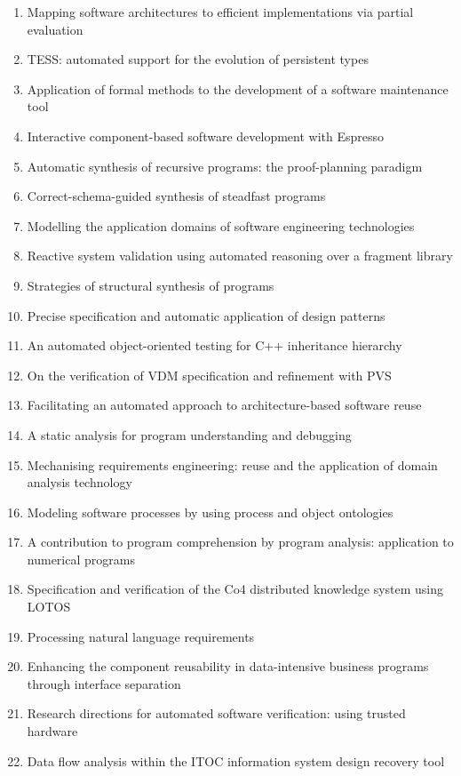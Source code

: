 \begin{enumerate}[itemsep=-1ex]
  \item Mapping software architectures to efficient implementations via partial evaluation
  \item TESS: automated support for the evolution of persistent types
  \item Application of formal methods to the development of a software maintenance tool
  \item Interactive component-based software development with Espresso
  \item Automatic synthesis of recursive programs: the proof-planning paradigm
  \item Correct-schema-guided synthesis of steadfast programs
  \item Modelling the application domains of software engineering technologies
  \item Reactive system validation using automated reasoning over a fragment library
  \item Strategies of structural synthesis of programs
  \item Precise specification and automatic application of design patterns
  \item An automated object-oriented testing for C++ inheritance hierarchy
  \item On the verification of VDM specification and refinement with PVS
  \item Facilitating an automated approach to architecture-based software reuse
  \item A static analysis for program understanding and debugging
  \item Mechanising requirements engineering: reuse and the application of domain analysis technology
  \item Modeling software processes by using process and object ontologies
  \item A contribution to program comprehension by program analysis: application to numerical programs
  \item Specification and verification of the Co4 distributed knowledge system using LOTOS
  \item Processing natural language requirements
  \item Enhancing the component reusability in data-intensive business programs through interface separation
  \item Research directions for automated software verification: using trusted hardware
  \item Data flow analysis within the ITOC information system design recovery tool

\end{enumerate}
